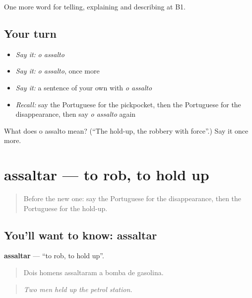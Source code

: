 \begin{grammarlens}[title={What you've built}]
One more word for telling, explaining and describing at B1.
\end{grammarlens}

\subsection*{Your turn}
\begin{itemize}
\raggedright
  \item \emph{Say it:} \emph{o assalto}
  \item \emph{Say it:} \emph{o assalto}, once more
  \item \emph{Say it:} a sentence of your own with \emph{o assalto}
  \item \emph{Recall:} say the Portuguese for the pickpocket, then the Portuguese for the disappearance, then say \emph{o assalto} again
\end{itemize}

\begin{tcolorbox}[breakable,colback=teal!4,colframe=teal!35!black,title={Before you move on}]
What does o assalto mean? (\textquotedblleft{}The hold-up, the robbery with force\textquotedblright{}.) Say it once more.
\end{tcolorbox}
\section[assaltar]{assaltar — to rob, to hold up}

\label{lesson:PT-C288-assaltar}



\begin{quote}
Before the new one: say the Portuguese for the disappearance, then the Portuguese for the hold-up.
\end{quote}

\subsection*{You'll want to know: assaltar}
\textbf{assaltar} — \textquotedblleft{}to rob, to hold up\textquotedblright{}.

\begin{quote}
Dois homens assaltaram a bomba de gasolina.
\end{quote}

\begin{quote}
\emph{Two men held up the petrol station.}
\end{quote}

